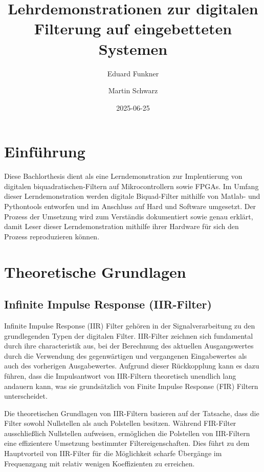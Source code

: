 \documentclass[
  ngerman,
  letterpaper,
  DIV=11]{scrreprt}
\title{Lehrdemonstrationen zur digitalen Filterung auf eingebetteten
Systemen}
\author{Eduard Funkner \and Martin Schwarz}
\date{2025-06-25}
\renewcommand*\contentsname{Inhaltsverzeichnis}
\newcommand\contentsname{Inhaltsverzeichnis}
\begin{document}
\maketitle

\renewcommand*\contentsname{Inhaltsverzeichnis}
{
\hypersetup{linkcolor=}
\setcounter{tocdepth}{2}
\tableofcontents
}

\chapter{Einführung}\label{einfuxfchrung}

Diese Bachlorthesis dient als eine Lerndemonstration zur Implentierung
von digitalen biquadratischen-Filtern auf Mikrocontrollern sowie FPGAs.
Im Umfang dieser Lerndemonstration werden digitale Biquad-Filter
mithilfe von Matlab- und Pythontools entworfen und im Anschluss auf Hard
und Software umgesetzt. Der Prozess der Umsetzung wird zum Verständis
dokumentiert sowie genau erklärt, damit Leser dieser Lerndemonstration
mithilfe ihrer Hardware für sich den Prozess reproduzieren können.

\chapter{Theoretische Grundlagen}\label{theoretische-grundlagen}

\section{Infinite Impulse Response
(IIR-Filter)}\label{infinite-impulse-response-iir-filter}

Infinite Impulse Response (IIR) Filter gehören in der Signalverarbeitung
zu den grundlegenden Typen der digitalen Filter. IIR-Filter zeichnen
sich fundamental durch ihre characteristik aus, bei der Berechnung des
aktuellen Ausgangswertes durch die Verwendung des gegenwärtigen und
vergangenen Eingabewertes als auch des vorherigen Ausgabewertes.
Aufgrund dieser Rückkopplung kann es dazu führen, dass die Impulsantwort
von IIR-Filtern theoretisch unendlich lang andauern kann, was sie
grundsätzlich von Finite Impulse Response (FIR) Filtern unterscheidet.

Die theoretischen Grundlagen von IIR-Filtern basieren auf der Tatsache,
dass die Filter sowohl Nullstellen als auch Polstellen besitzen. Während
FIR-Filter ausschließlich Nullstellen aufweisen, ermöglichen die
Polstellen von IIR-Filtern eine effizientere Umsetzung bestimmter
Filtereigenschaften. Dies führt zu dem Hauptvorteil von IIR-Filter für
die Möglichkeit scharfe Übergänge im Frequenzgang mit relativ wenigen
Koeffizienten zu erreichen.
\end{document}
